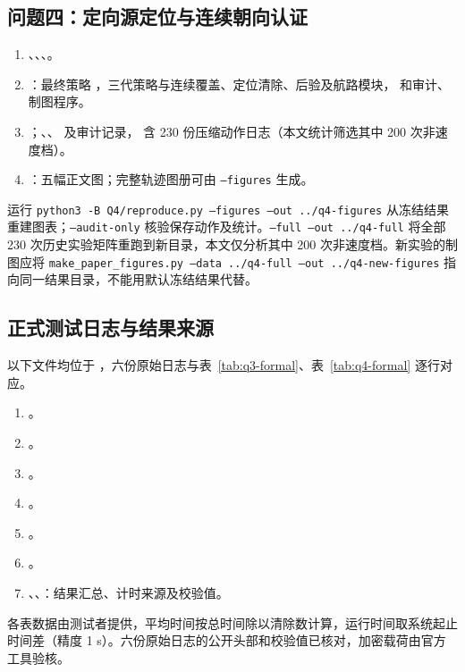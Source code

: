 \begin{appendices}
\subsection{问题四：定向源定位与连续朝向认证}
\begin{enumerate}[label=\arabic*.]
\item {}、、、。
\item {}：最终策略 ，三代策略与连续覆盖、定位清除、后验及航路模块， 和审计、制图程序。
\item {}；、、 及审计记录， 含 230 份压缩动作日志（本文统计筛选其中 200 次非速度档）。
\item {}：五幅正文图；完整轨迹图册可由 \texttt{--figures} 生成。
\end{enumerate}
运行 \texttt{python3 -B Q4/reproduce.py --figures --out ../q4-figures} 从冻结结果重建图表；\texttt{--audit-only} 核验保存动作及统计。\texttt{--full --out ../q4-full} 将全部 230 次历史实验矩阵重跑到新目录，本文仅分析其中 200 次非速度档。新实验的制图应将 \texttt{make\_paper\_figures.py --data ../q4-full --out ../q4-new-figures} 指向同一结果目录，不能用默认冻结结果代替。

\subsection{正式测试日志与结果来源}\label{app:formal}
以下文件均位于 ，六份原始日志与表~\ref{tab:q3-formal}、表~\ref{tab:q4-formal} 逐行对应。
\begin{enumerate}[label=\arabic*.]
\item {}。
\item {}。
\item {}。
\item {}。
\item {}。
\item {}。
\item {}、、：结果汇总、计时来源及校验值。
\end{enumerate}
各表数据由测试者提供，平均时间按总时间除以清除数计算，运行时间取系统起止时间差（精度 1 s）。六份原始日志的公开头部和校验值已核对，加密载荷由官方工具验核。

\endgroup

\end{appendices}
